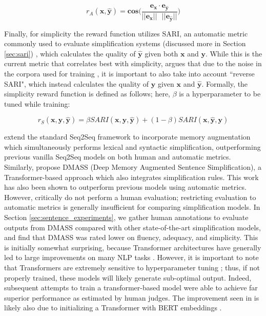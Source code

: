\documentclass[thesis.tex]{subfiles}
\begin{document}
\begin{equation}
    r_A(\textbf{x}, \hat{\textbf{y}}) = \textbf{cos}\bigg(\frac{\textbf{e}_{\textbf{x}} \cdot \textbf{e}_{\hat{\textbf{y}}}}{||\textbf{e}_{\textbf{x}}||\text{ } ||\textbf{e}_{\hat{\textbf{y}}}||}\bigg)
\end{equation}

Finally, for simplicity the reward function utilizes SARI, an automatic metric commonly used to evaluate simplification systems (discussed more in Section \ref{sec:sari}) \citep{xu2016optimizing}, which calculates the quality of $\hat{\textbf{y}}$ given both $\textbf{x}$ and $\textbf{y}$. While this is the current metric that correlates best with simplicity, \cite{zhang2017sentence} argues that due to the noise in the corpora used for training \citep{zhu2010monolingual,xu2015problems}, it is important to also take into account ``reverse SARI", which instead calculates the quality of $\textbf{y}$ given $\textbf{x}$ and $\hat{\textbf{y}}$. Formally, the simplicity reward function is defined as follows; here, $\beta$ is a hyperparameter to be tuned while training:

\begin{equation}
    r_S(\textbf{x}, \textbf{y}, \hat{\textbf{y}}) = \beta SARI(\textbf{x}, \textbf{y}, \hat{\textbf{y}}) + (1 - \beta)SARI(\textbf{x}, \hat{\textbf{y}}, \textbf{y})
\end{equation}

\cite{vu2018sentence} extend the standard Seq2Seq framework to incorporate memory augmentation which simultaneously performs lexical and syntactic simplification, outperforming previous vanilla Seq2Seq models on both human and automatic metrics. Similarly, \cite{zhao2018integrating} propose DMASS (Deep Memory Augmented Sentence Simplification), a Transformer-based approach \citep{vaswani2017attention} which also integrates simplification rules. This work has also been shown to outperform previous models using automatic metrics. However, \cite{zhao2018integrating} critically do not perform a human evaluation; restricting evaluation to automatic metrics is generally insufficient for comparing simplification models. In Section \ref{sec:sentence_experiments}, we gather human annotations to evaluate outputs from DMASS compared with other state-of-the-art simplification models, and find that DMASS was rated lower on fluency, adequacy, and simplicity. This is initially somewhat surprising, because Transformer architectures have generally led to large improvements on many NLP tasks \citep{vaswani2017attention}. However, it is important to note that Transformers are extremely sensitive to hyperparameter tuning \citep{popel2018training}; thus, if not properly trained, these models will likely generate sub-optimal output. Indeed, subsequent attempts to train a transformer-based model were able to achieve far superior performance \citep{mallison2019controllable, jiang2020neural} as estimated by human judges. The improvement seen in \cite{jiang2020neural} is likely also due to initializing a Transformer with BERT embeddings \citep{devlin2019bert}.
\end{document}
